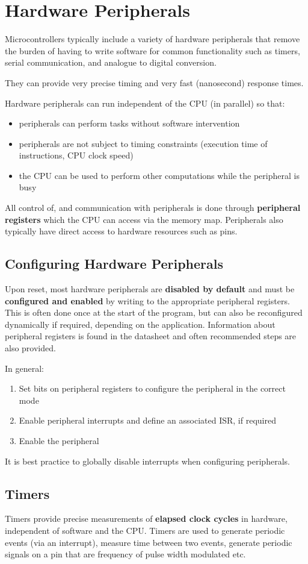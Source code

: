 \documentclass{report}
\begin{document}
\chapter{Hardware Peripherals}
Microcontrollers typically include a variety of hardware peripherals
that remove the burden of having to write software
for common functionality such as
timers, serial communication,
and analogue to digital conversion.

They can provide very precise timing and very fast (nanosecond) response times.

Hardware peripherals can run independent of the CPU (in parallel)
so that:
\begin{itemize}
    \item peripherals can perform tasks without software intervention
    \item peripherals are not subject to timing constraints (execution time of instructions, CPU clock speed)
    \item the CPU can be used to perform other computations while the peripheral is busy
\end{itemize}
All control of, and communication with peripherals is done through \textbf{peripheral registers}
which the CPU can access via the memory map. Peripherals also typically have direct access
to hardware resources such as pins.
\section{Configuring Hardware Peripherals}
Upon reset, most hardware peripherals are \textbf{disabled by default}
and must be \textbf{configured and enabled} by writing to the appropriate peripheral registers.
This is often done once at the start of the program, but can also be reconfigured dynamically
if required, depending on the application. Information about peripheral registers is found in the
datasheet and often recommended steps are also provided.

In general:
\begin{enumerate}
    \item Set bits on peripheral registers to configure the peripheral in the correct mode
    \item Enable peripheral interrupts and define an associated ISR, if required
    \item Enable the peripheral
\end{enumerate}
It is best practice to globally disable interrupts when configuring peripherals.
\section{Timers}
Timers provide precise measurements of \textbf{elapsed clock cycles} in
hardware, independent of software and the CPU\@.
Timers are used to generate periodic events (via an interrupt),
measure time between two events, generate periodic signals on a pin
that are frequency of pulse width modulated etc.
\end{document}

